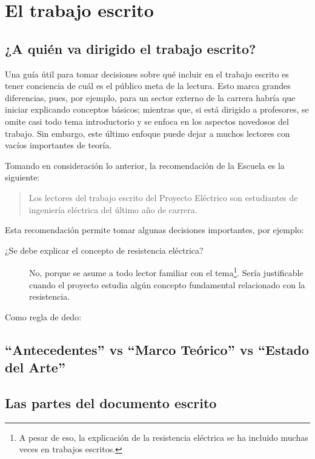   \chapter{El trabajo escrito} 
\label{C:antecedentes}

\section{¿A quién va dirigido el trabajo escrito?}

Una guía útil para tomar decisiones sobre qué incluir en el trabajo escrito es tener conciencia de cuál es el público meta de la lectura. Esto marca grandes diferencias, pues, por ejemplo, para un sector externo de la carrera habría que iniciar explicando conceptos básicos; mientras que, si está dirigido a profesores, se omite casi todo tema introductorio y se enfoca en los aspectos novedosos del trabajo. Sin embargo, este último enfoque puede dejar a muchos lectores con vacíos importantes de teoría.

Tomando en consideración lo anterior, la recomendación de la Escuela es la siguiente:

\begin{quote}
Los lectores del trabajo escrito del Proyecto Eléctrico son estudiantes de ingeniería eléctrica del último año de carrera.
\end{quote}

Esta recomendación permite tomar algunas decisiones importantes, por ejemplo:

\begin{description}
\item[¿Se debe explicar el concepto de resistencia eléctrica?] No, porque se asume a todo lector familiar con el tema\footnote{A pesar de eso, la explicación de la resistencia eléctrica se ha incluido muchas veces en trabajos escritos.}. Sería justificable cuando el proyecto estudia algún concepto fundamental relacionado con la resistencia.
\end{description}

Como regla de dedo:

\section{``Antecedentes'' vs ``Marco Teórico'' vs ``Estado del Arte''}

\section{Las partes del documento escrito}


